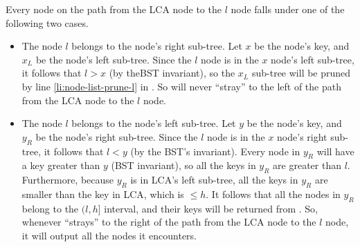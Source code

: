 \documentclass[12pt,twoside]{article}
\begin{document}
\begin{problems}
\begin{problemparts}
{  \begin{center}
  \hspace*{-25mm}
  \end{center}
  
  Every node on the path from the LCA node to the $l$ node falls under one of
  the following two cases.
  \begin{itemize}
    \item The node $l$ belongs to the node's right sub-tree. Let $x$ be the
    node's key, and $x_L$ be the node's left sub-tree. Since the $l$ node is in
    the $x$ node's left sub-tree, it follows that $l > x$ (by theBST
    invariant), so the $x_L$ sub-tree will be pruned by line
    \ref{li:node-list-prune-l} in . So  will
    never ``stray'' to the left of the path from the LCA node to the $l$ node.
     
    \item The node $l$ belongs to the node's left sub-tree. Let $y$ be the
    node's key, and $y_R$ be the node's right sub-tree. Since the $l$ node is in
    the $x$ node's right sub-tree, it follows that $l < y$ (by the BST's
    invariant). Every node in $y_R$ will have a key greater than $y$ (BST
    invariant), so all the keys in $y_R$ are greater than $l$. Furthermore,
    because $y_R$ is in LCA's left sub-tree, all the keys in $y_R$ are smaller
    than the key in LCA, which is $\le h$. It follows that all the nodes in
    $y_R$ belong to the $(l, h]$ interval, and their keys will be returned from
    . So, whenever  ``strays'' to the right of
    the path from the LCA node to the $l$ node, it will output all the nodes it
    encounters.
  \end{itemize}
  
}
\end{problemparts}
\end{problems}
\end{document}
